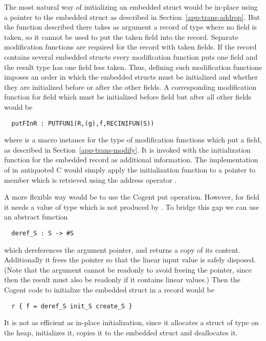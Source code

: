 The most natural way of initializing an embedded struct would be in-place using a pointer to the embedded struct as described
in Section~\ref{app-trans-addrop}. But the function  described there takes as argument a record of type 
where no field is taken, so it cannot be used to put the taken field  into the record. Separate modification functions
are required for the record with taken fields. If the record contains several embedded structs every modification function
puts one field and the result type has one field less taken. Thus, defining such modification functions imposes an order
in which the embedded structs must be initialized and whether they are initialized before or after the other fields. A corresponding
modification function for field  which must be initialized before field  but after all other fields would be
\begin{verbatim}
  putFInR : PUTFUN1(R,(g),f,RECINIFUN(S))
\end{verbatim}
where  is a macro instance for the type of modification functions which put a field, as described in 
Section~\ref{app-trans-modify}. It is invoked with the initialization function for the embedded record as additional information.
The implementation of  in antiquoted C would simply apply the initialization function to a pointer to member 
 which is retrieved using the address operator \code{\&}.

A more flexible way would be to use the Cogent put operation. However, for field  it needs a value of type 
 which is not produced by . To bridge this gap we can use an abstract function
\begin{verbatim}
  deref_S : S -> #S
\end{verbatim}
which dereferences the argument pointer, and returns a copy of its content. Additionally it frees the pointer so that the
linear input value is safely disposed. (Note that the argument cannot be readonly to avoid freeing the pointer, since then
the result must also be readonly if it contains linear values.) Then the Cogent code to initialize the embedded struct 
 in a record  would be
\begin{verbatim}
  r { f = deref_S init_S create_S }
\end{verbatim}
It is not as efficient as in-place initialization, since it allocates a struct of type  on the heap, initializes it,
copies it to the embedded struct  and deallocates it.

